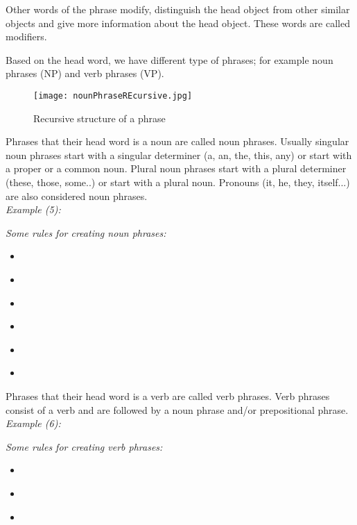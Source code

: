 Other words of the phrase modify, distinguish the head object from other similar objects and give more information about the head object. These words are called modifiers.

Based on the head word, we have different type of phrases; for example noun phrases (NP) and verb phrases (VP).

\newpage
\begin{figure}[h]
   \begin{center}
	  \texttt{[image: nounPhraseREcursive.jpg]} 
 	  \caption[Recursive structure of a phrase]{Recursive structure of a phrase}
	  \label{Figure 4}
    \end{center}
\end{figure}
 
Phrases that their head word is a noun are called noun phrases. Usually singular noun phrases start with a singular determiner (a, an, the, this, any) or start with a proper or a common noun. Plural noun phrases start with a plural determiner (these, those, some..) or start with a plural noun. Pronouns (it, he, they, itself...) are also considered noun phrases.\\ 

\emph{Example (5):}
\begin{changemargin}{10mm}{10mm} 
   \emph{Some rules for creating noun phrases:}
   \begin{itemize}
  	    \item \emph{ }
  	    \item \emph{ }
  		\item \emph{ }
  		\item \emph{ }
  		\item \emph{ }
  		\item \emph{ } 
   \end{itemize}
\end{changemargin} 
\vspace{4mm}

Phrases that their head word is a verb are called verb phrases. Verb phrases consist of a verb and are followed by a noun phrase and/or prepositional phrase. \\
 
\emph{Example (6):}
\begin{changemargin}{10mm}{10mm} 
   \emph{  Some rules for creating verb phrases:}
    \begin{itemize}
  	    \item \emph{ }
  		\item \emph{ }
  		\item \emph{ }
	\end{itemize}
\end{changemargin}
 
